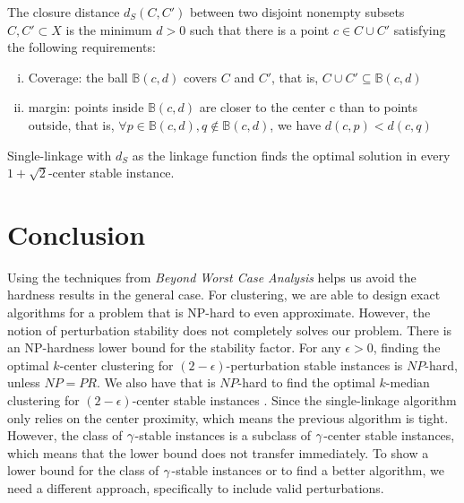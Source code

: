 \begin{definition}
The closure distance $d_S(C,C')$ between two disjoint nonempty subsets $C,C' \subset X$ is the minimum $d>0$ such that there is a point $c\in C\cup C'$ satisfying the following requirements:
\begin{enumerate}[(i)]
    \item Coverage: the ball $\mathbb{B}(c,d)$ covers $C$ and $C'$, that is, $C\cup C' \subseteq \mathbb{B}(c,d)$ 
    \item margin: points inside $\mathbb{B}(c,d)$ are closer to the center c than to points outside, that is, $\forall p \in \mathbb{B}(c,d), q\notin \mathbb{B}(c,d)$, we have $d(c,p)<d(c,q)$
\end{enumerate}

\end{definition}
\begin{lemma}
Single-linkage with $d_S$ as the linkage function finds the optimal solution in every $1+\sqrt{2}$-center stable instance. 
\end{lemma}






\section{Conclusion}



Using the techniques from \emph{Beyond Worst Case Analysis} helps us avoid the hardness results in the general case. For clustering, we are able to design exact algorithms for a problem that is NP-hard to even approximate. However, the notion of perturbation stability does not completely solves our problem. There is an NP-hardness lower bound for the stability factor. For any $\epsilon>0$, finding the optimal $k$-center clustering for $(2-\epsilon)$-perturbation stable instances is $NP$-hard, unless $NP=PR$\cite{Balcan2015}. We also have that is $NP$-hard to find the optimal $k$-median clustering for $(2-\epsilon)$-center stable instances \cite{Ben-David2014}. Since the single-linkage algorithm only relies on the center proximity, which means the previous algorithm is tight. However, the class of $\gamma$-stable instances is a subclass of $\gamma$-center stable instances, which means that the lower bound does not transfer immediately. To show a lower bound for the class of $\gamma$-stable instances or to find a better algorithm, we need a different approach, specifically to include valid perturbations.

